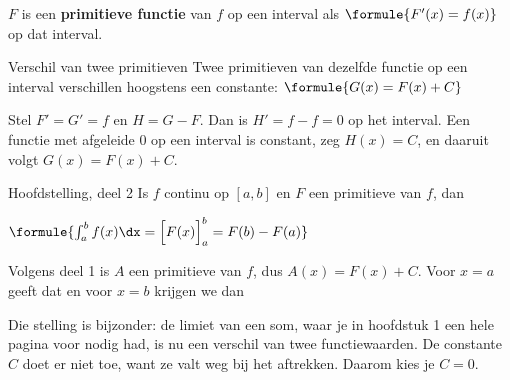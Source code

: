\begin{theorie}
$F$ is een \textbf{\textcolor{accent}{primitieve functie}} van $f$ op een interval als $\formule{F'(x) = f(x)}$ op dat interval.

\begin{stelling}{Verschil van twee primitieven}
Twee primitieven van dezelfde functie op een interval verschillen hoogstens een constante: \quad $\formule{G(x) = F(x) + C}$
\end{stelling}

\begin{bewijs}
Stel $F' = G' = f$ en $H = G - F$. Dan is $H' = f - f = 0$ op het interval. Een functie met afgeleide 0 op een interval is constant, zeg $H(x) = C$, en daaruit volgt $G(x) = F(x) + C$.
\end{bewijs}

\begin{stelling}{Hoofdstelling, deel 2}
Is $f$ continu op $[a, b]$ en $F$ een primitieve van $f$, dan

\vspace{1mm}
\qquad $\formule{\int_a^b f(x)\dx = \Bigl[F(x)\Bigr]_a^b = F(b) - F(a)}$
\end{stelling}

\begin{bewijs}
Volgens deel 1 is $A$ een primitieve van $f$, dus $A(x) = F(x) + C$. Voor $x = a$ geeft dat
en voor $x = b$ krijgen we dan
\end{bewijs}
\end{theorie}


Die stelling is bijzonder: de limiet van een som, waar je in hoofdstuk 1 een hele pagina voor nodig had, is nu een verschil van twee functiewaarden. De constante $C$ doet er niet toe, want ze valt weg bij het aftrekken. Daarom kies je $C = 0$.

